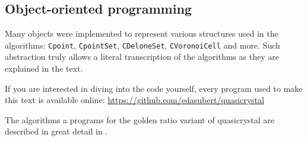 \documentclass[text.tex]{subfiles}
\begin{document}
  
  

\subsection{Object-oriented programming}
Many objects were implemented to represent various structures used in the algorithms: \texttt{Cpoint}, \texttt{CpointSet}, \texttt{CDeloneSet}, \texttt{CVoronoiCell} and more. Such abstraction truly allows a literal transcription of the algorithms as they are explained in the text. 

If you are interested in diving into the code yourself, every program used to make this text is available online:
\url{https://github.com/edasubert/quasicrystal}

The algorithms a programs for the golden ratio variant of quasicrystal are described in great detail in \cite{magister}. 
\end{document}
